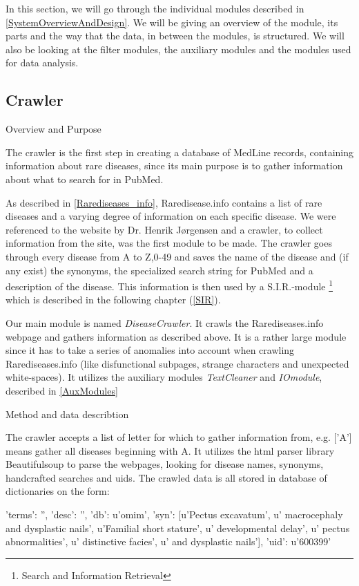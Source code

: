 In this section, we will go through the individual modules described
in \ref{SystemOverviewAndDesign}. We will be giving an
overview of the module, its parts and the way that the data, in
between the modules, is structured. We will also be looking at the
filter modules, the auxiliary modules and the modules used for data
analysis.

\subsection{Crawler\label{Crawler}}

Overview and Purpose

The crawler is the first step in creating a database of MedLine
records, containing information about rare diseases, since its main
purpose is to gather information about what to search for in PubMed.

As described in \ref{Rarediseases_info}, Raredisease.info contains a
list of rare diseases and a varying degree of information on each
specific disease. We were referenced to the website by Dr. Henrik
Jørgensen \cite{TheDude} and a crawler, to collect
information from the site, was the first module to be made. The
crawler goes through every disease from A to Z,0-49 and saves the name
of the disease and (if any exist) the synonyms, the specialized search
string for PubMed and a description of the disease. This information
is then used by a S.I.R.-module \footnote{Search and Information
  Retrieval} which is described in the following chapter (\ref{SIR}).

Our main module is named \textit{DiseaseCrawler}. It crawls the Rarediseases.info webpage and gathers information as described above. It is a rather large module since it has to take a series of anomalies into account when crawling Rarediseases.info (like disfunctional subpages, strange characters and unexpected white-spaces). It utilizes the auxiliary modules \textit{TextCleaner} and \textit{IOmodule}, described in \ref{AuxModules}

Method and data describtion

The crawler accepts a list of letter for which to gather information from, e.g. ['A'] means gather all diseases beginning with A. It utilizes the html parser library Beautifulsoup  to parse the webpages, looking for disease names, synonyms, handcrafted searches and uids. The crawled data is all stored in database of dictionaries on the form:

{'terms': '', 'desc': '', 'db': u'omim', 'syn': [u'Pectus excavatum', u' macrocephaly and dysplastic nails', u'Familial short stature', u' developmental delay', u' pectus abnormalities', u' distinctive facies', u' and dysplastic nails'], 'uid': u'600399'}

